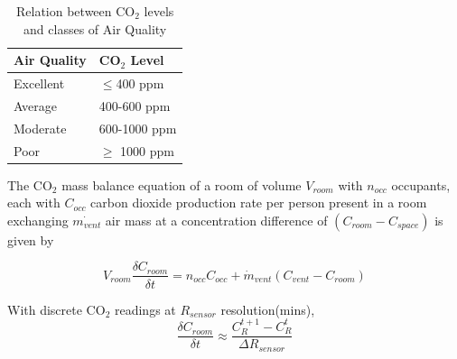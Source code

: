 \begin{table}[h!]
\centering
\begin{tabular}{|l|l|}
\hline
Air Quality & CO$_2$ Level          \\ \hline
Excellent   & $\leq$400 ppm         \\ \hline
Average     & 400-600 ppm           \\ \hline
Moderate    & 600-1000 ppm          \\ \hline
Poor        & $\geq$  1000 ppm \\ \hline
\end{tabular}
\caption{Relation between CO$_2$ levels and classes of Air Quality}
\label{table:co2Values}
\end{table}
 
The CO$_2$ mass balance equation \cite{cali2015co2} of a room of volume $V_{room}$ with $n_{occ}$ occupants, each with $C_{occ}$ carbon dioxide production rate per person  \cite{persily2017new} present in a room exchanging $\Dot{m_{vent}}$ air mass at a concentration difference of $(C_{room} - C_{space})$ is given by 

\begin{equation}
    V_{room} \frac{\delta C_{room}}{\delta t} = n_{occ}C_{occ} + \Dot{m}_{vent} ( C_{vent} - C_{room})
    \label{eq:mass_balance}
\end{equation}
 
With discrete CO$_2$ readings at $R_{sensor}$ resolution(mins), 
\begin{equation}
    \frac{\delta C_{room}}{\delta t} \approx \frac{C^{t+1}_R - C^t_R}{\Delta R_{sensor}}
    \label{eq:discreteco2}
\end{equation} 

